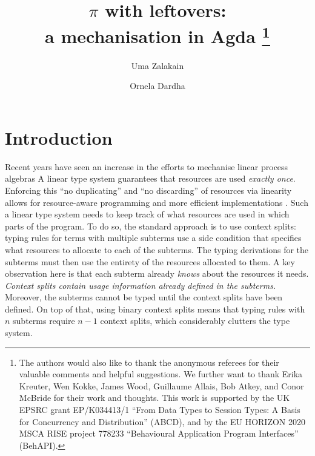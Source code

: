 \documentclass[]{llncs}
\title{
  $\pi$ with leftovers: \\ a mechanisation in Agda
  \thanks{
    The authors would also like to thank the anonymous referees for their valuable comments and helpful suggestions.
    We further want to thank Erika Kreuter, Wen Kokke, James Wood, Guillaume Allais, Bob Atkey, and Conor McBride for their work and thoughts.
    This work is supported by the UK EPSRC grant EP/K034413/1 ``From Data Types to Session Types: A Basis for Concurrency and Distribution'' (ABCD), and by the EU HORIZON 2020 MSCA RISE project 778233 ``Behavioural Application Program Interfaces'' (BehAPI).}
}
\author{
  Uma Zalakain\inst{1}\orcidID{0000-0002-3268-9338}
  \and
  Ornela Dardha\inst{2}\orcidID{0000-0001-9927-7875}
}
\institute{
  University of Glasgow, Scotland \\ \email{u.zalakain.1@research.gla.ac.uk}
  \and
  University of Glasgow, Scotland \\ \email{ornela.dardha@glasgow.ac.uk}
}
\newcommand{\picalc}{$\pi$-calculus}
\begin{document}
\maketitle

\begin{abstract}
%
%
\end{abstract}

\section{Introduction}

Recent years have seen an increase in the efforts to mechanise linear process algebras \cite{Gay2001,Goto2016a,Gay2010,Thiemann2019,Ciccone}
A linear type system guarantees that resources are used \emph{exactly once}.
Enforcing this ``no duplicating'' and ``no discarding'' of resources via linearity allows for resource-aware programming and more efficient implementations \cite{Wadler90}.
Such a linear type system needs to keep track of what resources are used in which parts of the program.
To do so, the standard approach is to use context splits: typing rules for terms with multiple subterms use a side condition that specifies what resources to allocate to each of the subterms.
The typing derivations for the subterms must then use the entirety of the resources allocated to them.
A key observation here is that each subterm already \emph{knows} about the resources it needs.
\emph{Context splits contain usage information already defined in the subterms.}
Moreover, the subterms cannot be typed until the context splits have been defined.
On top of that, using binary context splits means that typing rules with $n$ subterms require $n - 1$ context splits, which considerably clutters the type system.
\end{document}
